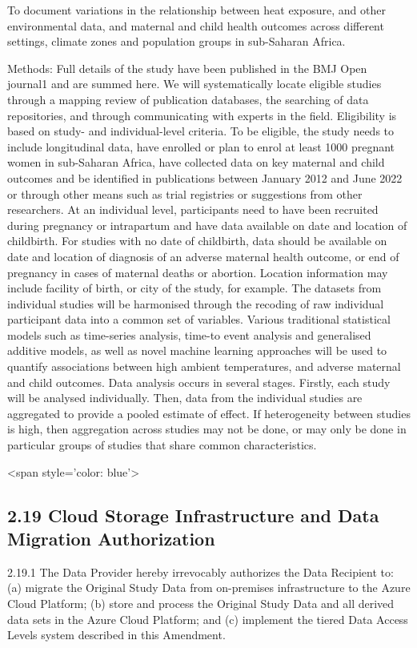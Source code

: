 \documentclass[12pt,letterpaper]{article}
\begin{document}
To document variations in the relationship between heat exposure, and other environmental data, and maternal and child health outcomes across different settings, climate zones and population groups in sub-Saharan Africa.

Methods: Full details of the study have been published in the BMJ Open journal1 and are summed here. We will systematically locate eligible studies through a mapping review of publication databases, the searching of data repositories, and through communicating with experts in the field. Eligibility is based on study- and individual-level criteria. To be eligible, the study needs to include longitudinal data, have enrolled or plan to enrol at least 1000 pregnant women in sub-Saharan Africa, have collected data on key maternal and child outcomes and be identified in publications between January 2012 and June 2022 or through other means such as trial registries or suggestions from other researchers. At an individual level, participants need to have been recruited during pregnancy or intrapartum and have data available on date and location of childbirth. For studies with no date of childbirth, data should be available on date and location of diagnosis of an adverse maternal health outcome, or end of pregnancy in cases of maternal deaths or abortion. Location information may include facility of birth, or city of the study, for example. The datasets from individual studies will be harmonised through the recoding of raw individual participant data into a common set of variables. Various traditional statistical models such as time-series analysis, time-to event analysis and generalised additive models, as well as novel machine learning approaches will be used to quantify associations between high ambient temperatures, and adverse maternal and child outcomes. Data analysis occurs in several stages. Firstly, each study will be analysed individually. Then, data from the individual studies are aggregated to provide a pooled estimate of effect. If heterogeneity between studies is high, then aggregation across studies may not be done, or may only be done in particular groups of studies that share common characteristics.

<span style='color: blue'>

\subsection*{2.19 Cloud Storage Infrastructure and Data Migration Authorization}

2.19.1 The Data Provider hereby irrevocably authorizes the Data Recipient to: (a) migrate the Original Study Data from on-premises infrastructure to the Azure Cloud Platform; (b) store and process the Original Study Data and all derived data sets in the Azure Cloud Platform; and (c) implement the tiered Data Access Levels system described in this Amendment.
\end{document}
